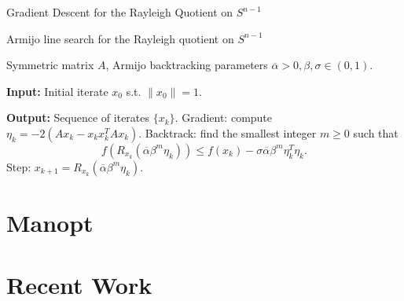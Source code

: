 \documentclass[xcolor=dvipsnames,t]{beamer} %
\begin{document}
\begin{frame}{Gradient Descent for the Rayleigh Quotient on $S^{n-1}$}
   
   \begin{algorithm}[H]
      \caption{Armijo line search for the Rayleigh quotient on $S^{n-1}$}
      \begin{algorithmic}[1] %
         \Require Symmetric matrix $A$, Armijo backtracking parameters $\overline{\alpha}>0,\beta,\sigma\in(0,1)$.
         \item[\textbf{Input:}] Initial iterate $x_0$ s.t. $\|x_0\|=1$. %
         \item[\textbf{Output:}] Sequence of iterates $\{x_k\}$.
            \State Gradient: compute ${\eta_k = -2(Ax_k-x_kx_k^TAx_k)}.$
            \State Backtrack: find the smallest integer $m\ge 0$ such that
            \[ f(R_{x_k}(\overline{\alpha}\beta^m\eta_k))\le f(x_k) - \sigma\overline{\alpha}\beta^m\eta_k^T\eta_k. \] 
            \State Step: $x_{k+1}=R_{x_k}(\overline{\alpha}\beta^m\eta_k)$.
         \EndFor
      \end{algorithmic}
   \end{algorithm}

\end{frame}



\section{Manopt}
\begin{frame}
\end{frame}



\section{Recent Work}
\begin{frame}
\end{frame}
\end{document}
